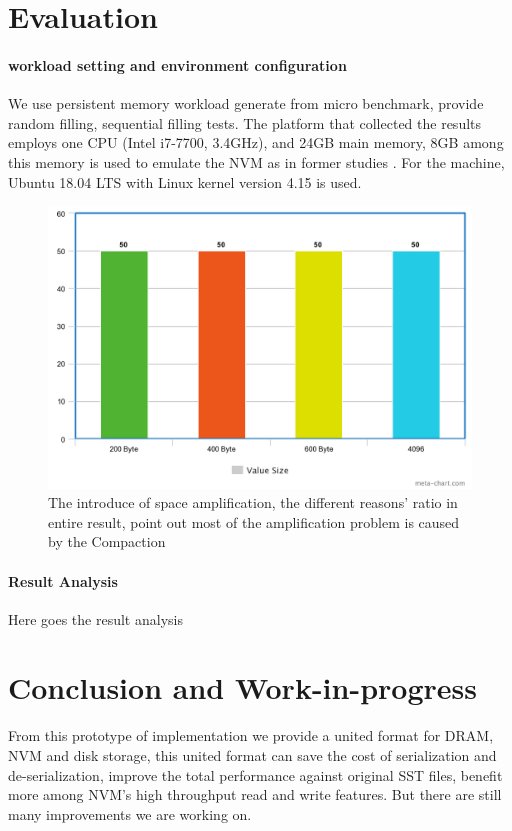 \section{Evaluation}

\paragraph{workload setting and environment configuration} We use persistent memory workload generate from micro benchmark, provide random filling, sequential filling tests. The platform that collected the results employs one CPU (Intel i7-7700, 3.4GHz), and 24GB main memory, 8GB among this memory is used to emulate the NVM as in former studies\cite{kannan2018redesigning,kaiyrakhmet2019slm} . For the machine, Ubuntu 18.04 LTS with Linux kernel version 4.15 is used. 


\begin{figure}
	\centering
	\includegraphics[width=0.7\columnwidth]{fig/meta2}
	\caption{The introduce of space amplification, the different reasons' ratio in entire result, point out most of the amplification problem is caused by the Compaction}
	\label{fig:space_amplification}
\end{figure}

\paragraph{Result Analysis} Here goes the result analysis

\section{Conclusion and Work-in-progress}
From this prototype of implementation we provide a united format for DRAM, NVM and disk storage, this united format can save the cost of serialization and de-serialization, improve the total performance against original SST files, benefit more among NVM's high throughput read and write features. But there are still many improvements we are working on.

